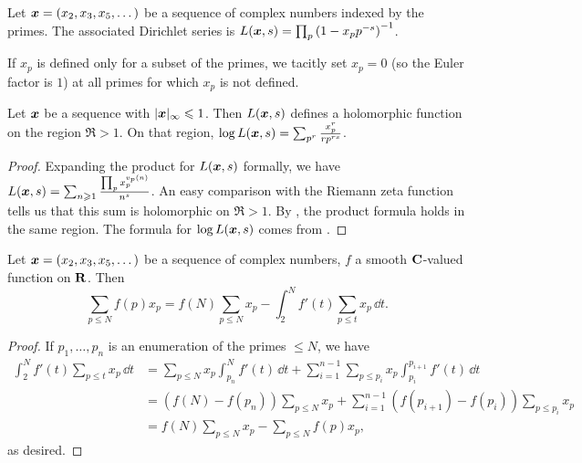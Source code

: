 \begin{definition}
Let ${\boldsymbol x}=(x_2,x_3,x_5,\dots)$ be a sequence of complex numbers indexed by the 
primes. The associated Dirichlet series is 
$L({\boldsymbol x},s) = \prod_p \left(1- x_p p^{-s}\right)^{-1}$. 
\end{definition}

If $x_p$ is defined only for a subset of the primes, we tacitly set $x_p = 0$ 
(so the Euler factor is $1$) at all primes for which $x_p$ is not defined. 

\begin{lemma}
Let ${\boldsymbol x}$ be a sequence with $|{\boldsymbol x}|_\infty \leqslant 1$. Then $L({\boldsymbol x},s)$ 
defines a holomorphic function on the region $\Re > 1$. On that region, 
$\log L({\boldsymbol x},s) = \sum_{p^r} \frac{x_p^r}{r p^{r s}}$. 
\end{lemma}
\begin{proof}
Expanding the product for $L({\boldsymbol x},s)$ formally, we have 
$L({\boldsymbol x},s) = \sum_{n\geqslant 1} \frac{\prod_p x_p^{v_p(n)}}{n^s}$. 
An easy comparison with the Riemann zeta function tells us that this sum 
is holomorphic on $\Re > 1$. By \cite[Th.~11.7]{apostol-1976}, the 
product formula holds in the same region. The formula for $\log L({\boldsymbol x},s)$ 
comes from \cite[11.9 Ex.~2]{apostol-1976}. 
\end{proof}

\begin{lemma}\label{lem:abel-sum}
Let ${\boldsymbol x}=(x_2,x_3,x_5,\dots)$ be a sequence of complex numbers, $f$ a smooth 
$\mathbf{C}$-valued function on $\mathbf{R}$. Then 
\[
	\sum_{p\leqslant N} f(p) x_p = f(N) \sum_{p\leqslant N} x_p - \int_2^N f'(t) \sum_{p\leqslant t} x_p\, \dd t .
\]
\end{lemma}
\begin{proof}
If $p_1,\dots,p_n$ is an enumeration of the primes $\leqslant N$, we have 
\begin{align*}
	\int_2^N f'(t) \sum_{p\leqslant t} x_p\, \dd t 
		&= \sum_{p\leqslant N} x_p \int_{p_n}^N f'(t)\, \dd t + \sum_{i=1}^{n-1} \sum_{p\leqslant p_i} x_p \int_{p_i}^{p_{i+1}} f'(t)\, \dd t \\
		&= \left(f(N) - f(p_n)\right) \sum_{p\leqslant N} x_p + \sum_{i=1}^{n-1} \left(f(p_{i+1}) - f(p_i)\right) \sum_{p\leqslant p_i} x_p \\
		&= f(N) \sum_{p\leqslant N} x_p - \sum_{p\leqslant N} f(p) x_p ,
\end{align*}
as desired. 
\end{proof}

